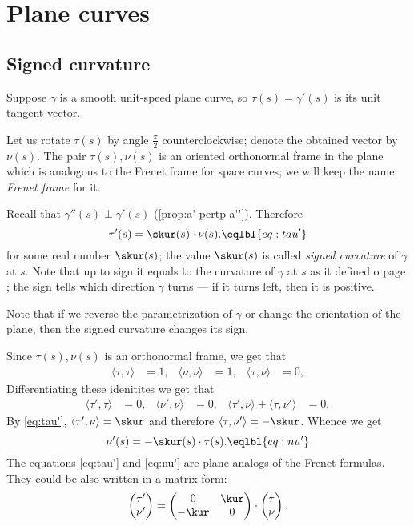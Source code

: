 \chapter{Plane curves}

\section*{Signed curvature}

Suppose $\gamma$ is a smooth unit-speed plane curve,
so $\tau(s)=\gamma'(s)$ is its unit tangent vector.

Let us rotate $\tau(s)$ by angle $\tfrac\pi 2$ counterclockwise; 
denote the obtained vector by $\nu(s)$.
The pair $\tau(s),\nu(s)$ is an oriented orthonormal frame in the plane which is analogous to the Frenet frame for space curves; we will keep the name \emph{Frenet frame} for it.

Recall that $\gamma''(s)\perp \gamma'(s)$ (\ref{prop:a'-pertp-a''}).
Therefore 
\[\tau'(s)=\skur(s)\cdot \nu(s).\eqlbl{eq:tau'}\]
for some real number $\skur(s)$;
the value $\skur(s)$ is called \emph{signed curvature} of $\gamma$ at $s$.
Note that up to sign it equals to the curvature of $\gamma$ at $s$ as it defined o page \pageref{page:curvature};
the sign tells which direction $\gamma$ turns --- if it turns left, then it is positive.

Note that if we reverse the parametrization of $\gamma$ or change the orientation of the plane, then
the signed curvature changes its sign.

Since $\tau(s),\nu(s)$ is an orthonormal frame, we get that 
\begin{align*}
\langle\tau,\tau\rangle&=1,
&
\langle\nu,\nu\rangle&=1,
&
\langle\tau,\nu\rangle&=0,
\end{align*}
Differentiating these idenitites we get that 
\begin{align*}
\langle\tau',\tau\rangle&=0,
&
\langle\nu',\nu\rangle&=0,
&
\langle\tau',\nu\rangle+\langle\tau,\nu'\rangle&=0,
\end{align*}
By \ref{eq:tau'}, $\langle\tau',\nu\rangle=\skur$ and therefore $\langle\tau,\nu'\rangle=-\skur$.
Whence we get 
\[\nu'(s)=-\skur(s)\cdot \tau(s).\eqlbl{eq:nu'}\]
The equations \ref{eq:tau'} and \ref{eq:nu'} are plane analogs of the Frenet formulas. 
They could be also written in a matrix form:
\[
\begin{pmatrix}
\tau'
\\
\nu'
\end{pmatrix}
=
\begin{pmatrix}
0&\kur
\\
-\kur&0
\end{pmatrix}
\cdot
\begin{pmatrix}
\tau
\\
\nu
\end{pmatrix}.
\]


